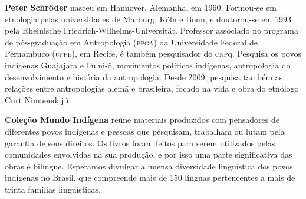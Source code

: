 \textbf{Peter Schröder} nasceu em Hannover, Alemanha, em 1960. Formou-se em etnologia pelas universidades de Marburg, Köln e Bonn, e doutorou-se em 1993 pela Rheinische Friedrich-Wilhelms-Universität. Professor associado no programa de pós-graduação em Antropologia (\textsc{ppga}) da Universidade Federal de Pernambuco (\textsc{ufpe}), em Recife, é também pesquisador do \textsc{cnp}q. Pesquisa os povos indígenas Guajajara e Fulni-ô, movimentos políticos indígenas, antropologia do desenvolvimento e história da antropologia. Desde 2009, pesquisa também as relações entre antropologias alemã e brasileira, focado na vida e obra do etnólogo Curt Nimuendajú.

\textbf{Coleção Mundo Indígena} reúne materiais produzidos com pensadores de diferentes povos indígenas e pessoas que pesquisam, trabalham ou lutam pela garantia de seus direitos. Os livros foram feitos para serem utilizados pelas comunidades envolvidas na sua produção, e por isso uma parte significativa das obras é bilíngue. Esperamos divulgar a imensa diversidade linguística dos povos indígenas no Brasil, que compreende mais de 150 línguas pertencentes a mais de trinta famílias linguísticas.

